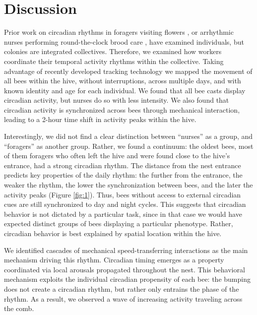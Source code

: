 \documentclass{article}
\begin{document}
\section{Discussion}
Prior work on circadian rhythms in foragers visiting flowers \cite{von_frisch_tanze_1965}, or arrhythmic nurses performing round-the-clock brood care \cite{moore_timekeeping_1998, bloch_reversal_2001}, have examined individuals, but colonies are integrated collectives. Therefore, we examined how workers coordinate their temporal activity rhythms within the collective. Taking advantage of recently developed tracking technology \cite{sixt_rendergan:_2018, wild_automatic_2018, boenisch_tracking_2018, wild_social_2021} we mapped the movement of all bees within the hive, without interruptions, across multiple days, and with known identity and age for each individual. We found that all bee casts display circadian activity, but nurses do so with less intensity. We also found that circadian activity is synchronized across bees through mechanical interaction, leading to a 2-hour time shift in activity peaks within the hive. 
 
Interestingly, we did not find a clear distinction between “nurses” as a group, and “foragers” as another group. Rather, we found a continuum: the oldest bees, most of them foragers who often left the hive and were found close to the hive’s entrance, had a strong circadian rhythm. The distance from the nest entrance predicts key properties of the daily rhythm: the further from the entrance, the weaker the rhythm, the lower the synchronization between bees, and the later the activity peaks (Figure \ref{fig:1}). Thus, bees without access to external circadian cues are still synchronized to day and night cycles. This suggests that circadian behavior is not dictated by a particular task, since in that case we would have expected distinct groups of bees displaying a particular phenotype. Rather, circadian behavior is best explained by spatial location within the hive.  

We identified cascades of mechanical speed-transferring interactions as the main mechanism driving this rhythm. Circadian timing emerges as a property coordinated via local arousals propagated throughout the nest. This behavioral mechanism exploits the individual circadian propensity of each bee: the bumping does not create a circadian rhythm, but rather only entrains the phase of the rhythm. As a result, we observed a wave of increasing activity traveling across the comb. 
\end{document}
